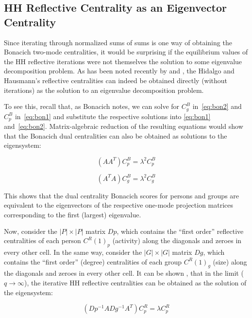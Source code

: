 \documentclass[a4paper,fleqn]{cas-sc}
\begin{document}
\subsection{HH Reflective Centrality as an Eigenvector Centrality} \label{subsec:refeigen}
Since iterating through normalized sums of sums is one way of obtaining the Bonacich two-mode centralities, it would be surprising if the equilibrium values of the HH reflective iterations were not themselves the solution to some eigenvalue decomposition problem. As has been noted recently by \citet{mealy2019interpreting} and \citet{van2021correspondence}, the Hidalgo and Hausmann's \citeyearpar{hidalgo2009building} reflective centralities can indeed be obtained directly (without iterations) as the solution to an eigenvalue decomposition problem. 

To see this, recall that, as Bonacich \citeyearpar[157]{bonacich1991simultaneous} notes, we can solve for $C^B_g$ in~\ref{eq:bon2} and $C^B_p$ in~\ref{eq:bon1} and substitute the respective solutions into \ref{eq:bon1} and~\ref{eq:bon2}. Matrix-algebraic reduction of the resulting equations would show that the Bonacich dual centralities can also be obtained as solutions to the eigensystem:

\begin{equation}
    \left(AA^T\right)C^B_p = \lambda^2 C^B_p
    \label{eq:bon3}
\end{equation}

\begin{equation}
    \left(A^TA\right)C^B_g = \lambda^2 C^B_g
    \label{eq:bon4}
\end{equation}

This shows that the dual centrality Bonacich scores for persons and groups are equivalent to the eigenvectors of the respective one-mode projection matrices corresponding to the first (largest) eigenvalue. 

Now, consider the $|P| \times |P|$ matrix $Dp$, which contains the ``first order'' reflective centralities of each person $C^R(1)_p$ (activity) along the diagonals and zeroes in every other cell. In the same way, consider the $|G| \times |G|$ matrix $Dg$, which contains the ``first order'' (degree) centralities of each group $C^R(1)_g$ (size) along the diagonals and zeroes in every other cell. It can be shown \citep{van2021correspondence}, that in the limit ($q \rightarrow \infty$), the iterative HH reflective centralities can be obtained as the solution of the eigensystem:

\begin{equation}
    \left(Dp^{-1}ADg^{-1}A^T\right)C^R_p = \lambda C^R_p
    \label{eq:dam1}
\end{equation}
\end{document}
